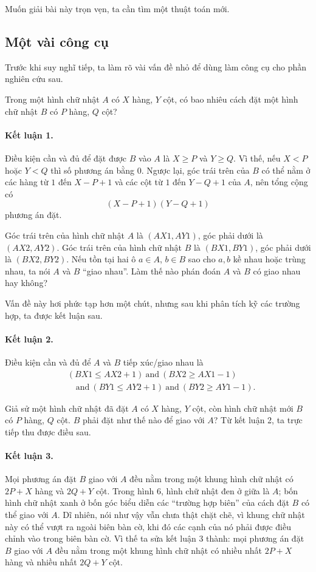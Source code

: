 \documentclass[11pt]{article}
\begin{document}
Muốn giải bài này trọn vẹn, ta cần tìm một thuật toán mới.

\subsection{Một vài công cụ}

Trước khi suy nghĩ tiếp, ta làm rõ vài vấn đề nhỏ để dùng làm công cụ cho
phần nghiên cứu sau.

Trong một hình chữ nhật \(A\) có \(X\) hàng, \(Y\) cột, có bao nhiêu cách
đặt một hình chữ nhật \(B\) có \(P\) hàng, \(Q\) cột?

\paragraph{Kết luận 1.}
Điều kiện cần và đủ để đặt được \(B\) vào \(A\) là \(X\ge P\) và
\(Y\ge Q\). Vì thế, nếu \(X<P\) hoặc \(Y<Q\) thì số phương án bằng \(0\).
Ngược lại, góc trái trên của \(B\) có thể nằm ở các hàng từ \(1\) đến
\(X-P+1\) và các cột từ \(1\) đến \(Y-Q+1\) của \(A\), nên tổng cộng có
\[
  (X-P+1)(Y-Q+1)
\]
phương án đặt.

Góc trái trên của hình chữ nhật \(A\) là \((AX1,AY1)\), góc phải dưới là
\((AX2,AY2)\). Góc trái trên của hình chữ nhật \(B\) là \((BX1,BY1)\),
góc phải dưới là \((BX2,BY2)\). Nếu tồn tại hai ô \(a\in A\), \(b\in B\)
sao cho \(a,b\) kề nhau hoặc trùng nhau, ta nói \(A\) và \(B\) ``giao
nhau''. Làm thế nào phán đoán \(A\) và \(B\) có giao nhau hay không?

Vấn đề này hơi phức tạp hơn một chút, nhưng sau khi phân tích kỹ các
trường hợp, ta được kết luận sau.

\paragraph{Kết luận 2.}
Điều kiện cần và đủ để \(A\) và \(B\) tiếp xúc/giao nhau là
\[
\begin{aligned}
  &(BX1\le AX2+1)\ \text{and}\ (BX2\ge AX1-1)\\
  &\quad\text{and}\ (BY1\le AY2+1)\ \text{and}\ (BY2\ge AY1-1).
\end{aligned}
\]

Giả sử một hình chữ nhật đã đặt \(A\) có \(X\) hàng, \(Y\) cột, còn hình
chữ nhật mới \(B\) có \(P\) hàng, \(Q\) cột. \(B\) phải đặt như thế nào
để giao với \(A\)? Từ kết luận 2, ta trực tiếp thu được điều sau.

\paragraph{Kết luận 3.}
Mọi phương án đặt \(B\) giao với \(A\) đều nằm trong một khung hình chữ
nhật có \(2P+X\) hàng và \(2Q+Y\) cột. Trong hình 6, hình chữ nhật đen ở
giữa là \(A\); bốn hình chữ nhật xanh ở bốn góc biểu diễn các ``trường
hợp biên'' của cách đặt \(B\) có thể giao với \(A\). Dĩ nhiên, nói như
vậy vẫn chưa thật chặt chẽ, vì khung chữ nhật này có thể vượt ra ngoài
biên bàn cờ, khi đó các cạnh của nó phải được điều chỉnh vào trong biên
bàn cờ. Vì thế ta sửa kết luận 3 thành: mọi phương án đặt \(B\) giao với
\(A\) đều nằm trong một khung hình chữ nhật có nhiều nhất \(2P+X\) hàng
và nhiều nhất \(2Q+Y\) cột.
\end{document}
